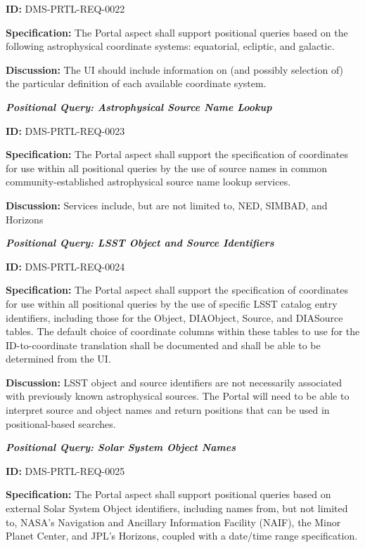 \documentclass[SE,toc,lsstdraft]{lsstdoc}
\begin{document}
\label{DMS-PRTL-REQ-0022}
\textbf{ID:} DMS-PRTL-REQ-0022

\textbf{Specification:}
The Portal aspect shall support positional queries based on the following astrophysical coordinate systems: equatorial, ecliptic, and galactic.

\textbf{Discussion:}
The UI should include information on (and possibly selection of) the particular definition of each available coordinate system.

\textbf{\textit{Positional Query: Astrophysical Source Name Lookup}}

\label{DMS-PRTL-REQ-0023}
\textbf{ID:} DMS-PRTL-REQ-0023

\textbf{Specification:}
The Portal aspect shall support the specification of coordinates for use within all positional queries by the use of source names in common community-established astrophysical source name lookup services.

\textbf{Discussion:}
Services include, but are not limited to, NED, SIMBAD, and Horizons

\textbf{\textit{Positional Query: LSST Object and Source Identifiers}}

\label{DMS-PRTL-REQ-0024}
\textbf{ID:} DMS-PRTL-REQ-0024

\textbf{Specification:}
The Portal aspect shall support the specification of coordinates for use within all positional queries by the use of specific LSST catalog entry identifiers, including those for the Object, DIAObject, Source, and DIASource tables.  The default choice of coordinate columns within these tables to use for the ID-to-coordinate translation shall be documented and shall be able to be determined from the UI.

\textbf{Discussion:}
LSST object and source identifiers are not necessarily associated with previously known astrophysical sources.  The Portal will need to be able to interpret source and object names and return positions that can be used in positional-based searches.

\textbf{\textit{Positional Query: Solar System Object Names}}

\label{DMS-PRTL-REQ-0025}
\textbf{ID:} DMS-PRTL-REQ-0025

\textbf{Specification:}
The Portal aspect shall support positional queries based on external Solar System Object identifiers, including names from, but not limited to, NASA’s Navigation and Ancillary Information Facility (NAIF), the Minor Planet Center, and JPL’s Horizons, coupled with a date/time range specification.
\end{document}
